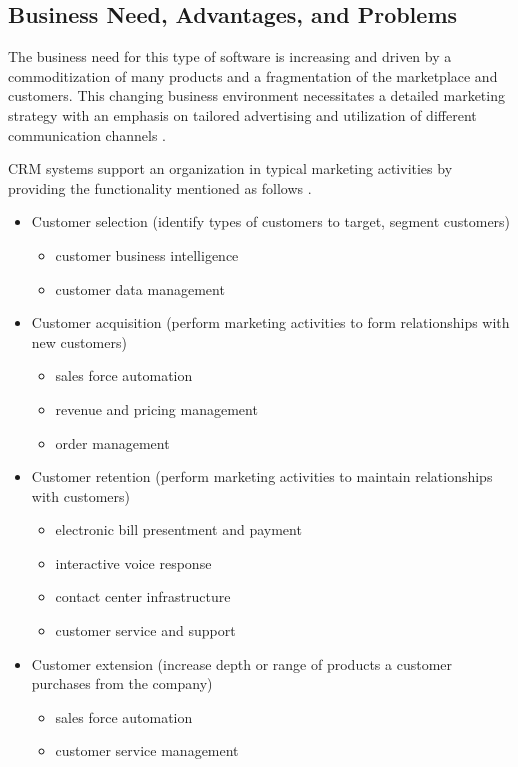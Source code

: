 \subsection{Business Need, Advantages, and Problems}
The business need for this type of software is increasing and driven by a commoditization of many products and a fragmentation of the marketplace and customers. This changing business environment necessitates a detailed marketing strategy with an emphasis on tailored advertising and utilization of different communication channels \citep{Brown2000}.

CRM systems support an organization in typical marketing activities by providing the functionality mentioned as follows \citep{Chaffey2011,Band2010b}.

\begin{singlespace}
	\begin{itemize}
		\item Customer selection (identify types of customers to target, segment customers)
			\begin{itemize}
				\item customer business intelligence
				\item customer data management
			\end{itemize}
		\item Customer acquisition (perform marketing activities to form relationships with new customers)
			\begin{itemize}
				\item sales force automation
				\item revenue and pricing management
				\item order management
			\end{itemize}
		\item Customer retention (perform marketing activities to maintain relationships with customers)
			\begin{itemize}
				\item electronic bill presentment and payment
				\item interactive voice response
				\item contact center infrastructure
				\item customer service and support
			\end{itemize}
		\item Customer extension (increase depth or range of products a customer purchases from the company)
			\begin{itemize}
				\item sales force automation
				\item customer service management
			\end{itemize}
	\end{itemize}
\end{singlespace}

